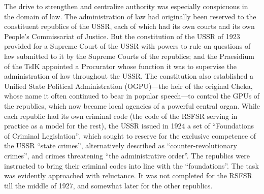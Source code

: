 The drive to strengthen and centralize authority was especially conspicuous in the domain of law. The administration of law had originally been reserved to the constituent republics of the USSR, each of which had its own courts and its own People's Commissariat of Justice. But the constitution of the USSR of 1923 provided for a Supreme Court of the USSR with powers to rule on questions of law submitted to it by the Supreme Courts of the republics; and the Praesidium of the TsIK appointed a Procurator whose function it was to supervise the administration of law throughout the USSR. The constitution also established a Unified State Political Administration (OGPU)---the heir of the original Cheka, whose name it often continued to bear in popular speech---to control the GPUs of the republics, which now became local agencies of a powerful central organ. While each republic had its own criminal code (the code of the RSFSR serving in practice as a model for the rest), the USSR issued in 1924 a set of ``Foundations of Criminal Legislation'', which sought to reserve for the exclusive competence of the USSR ``state crimes'', alternatively described as ``counter-revolutionary crimes'', and crimes threatening ``the administrative order''. The republics were instructed to bring their criminal codes into line with the ``foundations''. The task was evidently approached with reluctance. It was not completed for the RSFSR till the middle of 1927, and somewhat later for the other republics. 


